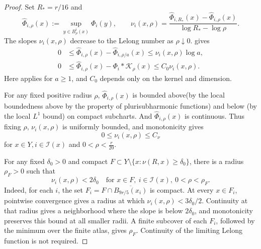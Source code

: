 \documentclass[reqno]{amsart}
\theoremstyle{remark}
\theoremstyle{plain}
\begin{document}
\begin{proof}
Set  \(R_*=r/16\) and
\[
\widehat{\Phi}_{i,\rho}(x):=\sup_{y\in B_\rho^i(x)}\Phi_i(y),\qquad
\nu_i(x,\rho)=\frac{\widehat{\Phi}_{i,R_*}(x)-\widehat{\Phi}_{i,\rho}(x)}
{\log R_*-\log\rho}.
\]
The slopes $\nu_i(x,\rho)$ decrease to the Lelong number as \(\rho\downarrow0\). \cite[Lemma 4.2]{Chen21} gives
\begin{equation}\label{eq:radial-estimates}
\begin{aligned}
0&\le \widehat{\Phi}_{i,\rho}(x)-\widehat{\Phi}_{i,\rho/a}(x)\le\nu_i(x,\rho)\log a,\\
0&\le \widehat{\Phi}_{i,\rho}(x)-\Phi_{i}*\mathcal{K}_\rho(x)\le C_0\nu_i(x,\rho).
\end{aligned}
\end{equation}
Here \cite[Lemma 4.2]{C21} applies for \(a\ge1\), and \(C_0\) depends only on the kernel and dimension. 

For any fixed positive radius \(\rho\), \(\widehat{\Phi}_{i,\rho}(x)\) is bounded above(by the local boundedness above by the property of plurisubharmonic functions) and below (by the local $L^1$ bound) on compact subcharts. And $\widehat{\Phi}_{i,\rho}(x)$ is continuous. Thus fixing $\rho$,  $\nu_i(x,\rho)$ is uniformly bounded, and monotonicity gives
\begin{equation}\label{eq:slope-bound}
0\le\nu_i(x,\rho)\le C_\nu
\end{equation}
for $x\in Y,i\in \mathcal{I}(x)$ and $0<\rho<\frac{r}{20}$. 


For any fixed \(\delta_0>0\) and compact
\(F\subset Y\setminus\{x:\nu(R,x)\ge\delta_0\}\), there is a radius \(\rho_F>0\) such that
\[
\nu_i(x,\rho)<2\delta_0
\quad\text{for }x\in F,\ i\in\mathcal I(x),\ 0<\rho<\rho_F.
\]
Indeed, for each \(i\), the set \(F_i=F\cap\overline{B_{9r/5}(x_i)}\) is compact. At every \(x\in F_i\), pointwise convergence gives a radius at which \(\nu_i(x,\rho)<3\delta_0/2\). Continuity at that radius gives a neighborhood where the slope is below \(2\delta_0\), and monotonicity preserves this bound at all smaller radii. A finite subcover of each \(F_i\), followed by the minimum over the finite atlas, gives \(\rho_F\). Continuity of the limiting Lelong function is not required.
 


\end{proof}
\end{document}
